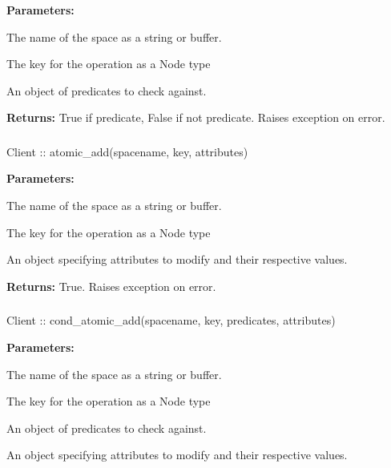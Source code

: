 \noindent\textbf{Parameters:}
\begin{description}[labelindent=\widthof{{\code{predicates}}},leftmargin=*,noitemsep,nolistsep,align=right]
\item[\code{spacename}] The name of the space as a string or buffer.
\item[\code{key}] The key for the operation as a Node type
\item[\code{predicates}] An object of predicates to check against.
\end{description}

\noindent\textbf{Returns:}
True if predicate, False if not predicate.  Raises exception on error.

\subsubsection{}
\label{api:nodejs:atomic_add}
\begin{javascriptcode}
Client :: atomic_add(spacename, key, attributes)
\end{javascriptcode}


\noindent\textbf{Parameters:}
\begin{description}[labelindent=\widthof{{\code{attributes}}},leftmargin=*,noitemsep,nolistsep,align=right]
\item[\code{spacename}] The name of the space as a string or buffer.
\item[\code{key}] The key for the operation as a Node type
\item[\code{attributes}] An object specifying attributes to modify and their respective values.
\end{description}

\noindent\textbf{Returns:}
True.  Raises exception on error.

\subsubsection{}
\label{api:nodejs:cond_atomic_add}
\begin{javascriptcode}
Client :: cond_atomic_add(spacename, key, predicates, attributes)
\end{javascriptcode}


\noindent\textbf{Parameters:}
\begin{description}[labelindent=\widthof{{\code{predicates}}},leftmargin=*,noitemsep,nolistsep,align=right]
\item[\code{spacename}] The name of the space as a string or buffer.
\item[\code{key}] The key for the operation as a Node type
\item[\code{predicates}] An object of predicates to check against.
\item[\code{attributes}] An object specifying attributes to modify and their respective values.
\end{description}


